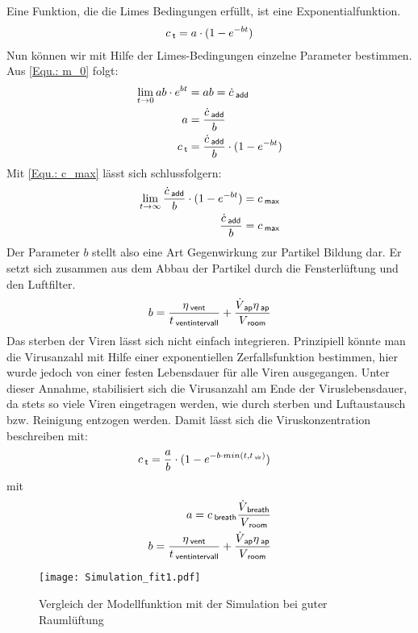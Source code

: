 \documentclass[12pt,a4paper,bibtotocnumbered,liststotocnumbered]{scrreprt}
\begin{document}
Eine Funktion, die die Limes Bedingungen erfüllt, ist eine Exponentialfunktion.
\begin{align}
c_{\: \mathsf{t}} = a\cdot(1 - e^{-bt})
\end{align}
Nun können wir mit Hilfe der Limes-Bedingungen einzelne Parameter bestimmen. Aus \autoref{Equ.: m_0} folgt:
\begin{align}
\lim \limits_{t \to 0} ab\cdot e^{bt} &= ab = \dot{c}_{\: \mathsf{add}}\\
a &= \frac{\dot{c}_{\: \mathsf{add}}}{b}\\
c_{\: \mathsf{t}} &= \frac{\dot{c}_{\: \mathsf{add}}}{b}\cdot(1 - e^{-bt})
\end{align}
Mit \autoref{Equ.: c_max} lässt sich schlussfolgern:
\begin{align}
\lim \limits_{t \to \infty} \frac{\dot{c}_{\: \mathsf{add}}}{b}\cdot(1 - e^{-bt})  & = c_{\: \mathsf{max}}\\
\frac{\dot{c}_{\: \mathsf{add}}}{b}  & = c_{\: \mathsf{max}}
\end{align}
Der Parameter $b$ stellt also eine Art Gegenwirkung zur Partikel Bildung dar. Er setzt sich zusammen aus dem Abbau der Partikel durch die Fensterlüftung und den Luftfilter.
\begin{align}
b = \frac{ \eta_{\: \mathsf{vent}} }{t_{\: \mathsf{ventintervall}}} +\frac{\dot{V}_{\: \mathsf{ap}}  \eta_{\: \mathsf{ap}}}{V_{\: \mathsf{room}}}
\end{align}
Das sterben der Viren lässt sich nicht einfach integrieren. Prinzipiell könnte man die Virusanzahl mit Hilfe einer exponentiellen Zerfallsfunktion bestimmen, hier wurde jedoch von einer festen Lebensdauer für alle Viren ausgegangen. Unter dieser Annahme, stabilisiert sich die Virusanzahl am Ende der Viruslebensdauer, da stets so viele Viren eingetragen werden, wie durch sterben und Luftaustausch bzw. Reinigung entzogen werden. Damit lässt sich die Viruskonzentration beschreiben mit:
\begin{align}
\label{Equ.: conc}
c_{\: \mathsf{t}} &= \frac{a}{b}\cdot(1 - e^{-b\cdot min(t,t_{\: \mathsf{vir}})})
\end{align}
mit
\begin{align}
a = c_{\: \mathsf{breath}} \frac{\dot{V}_{\: \mathsf{breath}}}{V_{\: \mathsf{room}}}\\
\label{Equ.: konst b}
b = \frac{ \eta_{\: \mathsf{vent}} }{t_{\: \mathsf{ventintervall}}} +\frac{\dot{V}_{\: \mathsf{ap}}  \eta_{\: \mathsf{ap}}}{V_{\: \mathsf{room}}}
\end{align}
\begin{figure}[H]
\begin{center}
\texttt{[image: Simulation\_fit1.pdf]}
\caption{Vergleich der Modellfunktion mit der Simulation bei guter Raumlüftung}
\label{Abb: Modell gut}
\end{center}
\end{figure}
\end{document}
